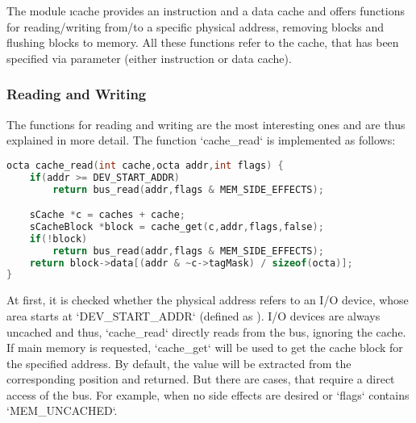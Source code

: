 The module \i{cache} provides an instruction and a data cache and offers functions for reading/writing from/to a specific physical address, removing blocks and flushing blocks to memory. All these functions refer to the cache, that has been specified via parameter (either instruction or data cache).

\subsubsection{Reading and Writing}

The functions for reading and writing are the most interesting ones and are thus explained in more detail. The function `cache_read` is implemented as follows:
\begin{lstlisting}[language=C,caption={Implementation of {\tt cache\_read}}]
octa cache_read(int cache,octa addr,int flags) {
	if(addr >= DEV_START_ADDR)
		return bus_read(addr,flags & MEM_SIDE_EFFECTS);

	sCache *c = caches + cache;
	sCacheBlock *block = cache_get(c,addr,flags,false);
	if(!block)
		return bus_read(addr,flags & MEM_SIDE_EFFECTS);
	return block->data[(addr & ~c->tagMask) / sizeof(octa)];
}
\end{lstlisting}
At first, it is checked whether the physical address refers to an I/O device, whose area starts at `DEV_START_ADDR` (defined as ). I/O devices are always uncached and thus, `cache_read` directly reads from the bus, ignoring the cache. If main memory is requested, `cache_get` will be used to get the cache block for the specified address. By default, the value will be extracted from the corresponding position and returned. But there are cases, that require a direct access of the bus. For example, when no side effects are desired or `flags` contains `MEM_UNCACHED`.

